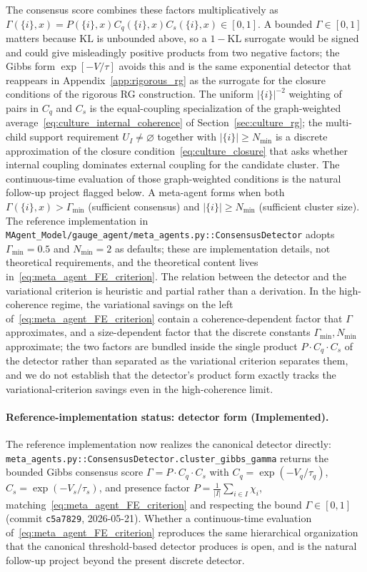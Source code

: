 \documentclass[11pt]{article}
\begin{document}
The consensus score combines these factors multiplicatively as $\Gamma(\{i\}, x) = P(\{i\}, x) C_q(\{i\}, x) C_s(\{i\}, x) \in [0, 1]$. A bounded $\Gamma \in [0, 1]$ matters because $\mathrm{KL}$ is unbounded above, so a $1 - \mathrm{KL}$ surrogate would be signed and could give misleadingly positive products from two negative factors; the Gibbs form $\exp[-V/\tau]$ avoids this and is the same exponential detector that reappears in Appendix~\ref{app:rigorous_rg} as the surrogate for the closure conditions of the rigorous RG construction. The uniform $|\{i\}|^{-2}$ weighting of pairs in $C_q$ and $C_s$ is the equal-coupling specialization of the graph-weighted average~\eqref{eq:culture_internal_coherence} of Section~\ref{sec:culture_rg}; the multi-child support requirement $U_I \neq \varnothing$ together with $|\{i\}| \geq N_{\min}$ is a discrete approximation of the closure condition~\eqref{eq:culture_closure} that asks whether internal coupling dominates external coupling for the candidate cluster. The continuous-time evaluation of those graph-weighted conditions is the natural follow-up project flagged below. A meta-agent forms when both $\Gamma(\{i\}, x) > \Gamma_{\min}$ (sufficient consensus) and $|\{i\}| \geq N_{\min}$ (sufficient cluster size). The reference implementation in \texttt{MAgent\_Model/gauge\_agent/meta\_agents.py::ConsensusDetector} adopts $\Gamma_{\min} = 0.5$ and $N_{\min} = 2$ as defaults; these are implementation details, not theoretical requirements, and the theoretical content lives in~\eqref{eq:meta_agent_FE_criterion}. The relation between the detector and the variational criterion is heuristic and partial rather than a derivation. In the high-coherence regime, the variational savings on the left of~\eqref{eq:meta_agent_FE_criterion} contain a coherence-dependent factor that $\Gamma$ approximates, and a size-dependent factor that the discrete constants $\Gamma_{\min}, N_{\min}$ approximate; the two factors are bundled inside the single product $P \cdot C_q \cdot C_s$ of the detector rather than separated as the variational criterion separates them, and we do not establish that the detector's product form exactly tracks the variational-criterion savings even in the high-coherence limit.

\paragraph{Reference-implementation status: detector form (Implemented).}
The reference implementation now realizes the canonical detector directly: \texttt{meta\_agents.py::ConsensusDetector.cluster\_gibbs\_gamma} returns the bounded Gibbs consensus score $\Gamma = P \cdot C_q \cdot C_s$ with $C_q = \exp(-V_q/\tau_q)$, $C_s = \exp(-V_s/\tau_s)$, and presence factor $P = \frac{1}{|I|}\sum_{i \in I}\chi_i$, matching~\eqref{eq:meta_agent_FE_criterion} and respecting the bound $\Gamma \in [0, 1]$ (commit \texttt{c5a7829}, 2026-05-21). Whether a continuous-time evaluation of~\eqref{eq:meta_agent_FE_criterion} reproduces the same hierarchical organization that the canonical threshold-based detector produces is open, and is the natural follow-up project beyond the present discrete detector.
\end{document}
